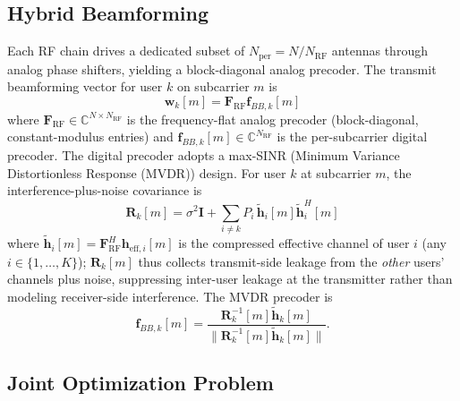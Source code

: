 \documentclass[10pt,conference]{IEEEtran}
\newcommand{\vect}[1]{\mathbf{#1}}
\newcommand{\mat}[1]{\mathbf{#1}}
\newcommand{\C}{\mathbb{C}}
\begin{document}
\subsection{Hybrid Beamforming}
Each RF chain drives a dedicated subset of $N_{\mathrm{per}} = N/N_{\mathrm{RF}}$ antennas through analog phase shifters, yielding a block-diagonal analog precoder. The transmit beamforming vector for user $k$ on subcarrier $m$ is
\begin{equation}
\vect{w}_k[m] = \mat{F}_{\text{RF}} \vect{f}_{BB,k}[m]
\label{eq:hybrid_bf}
\end{equation}
where $\mat{F}_{\text{RF}} \in \C^{N \times N_{\text{RF}}}$ is the frequency-flat analog precoder (block-diagonal, constant-modulus entries) and $\vect{f}_{BB,k}[m] \in \C^{N_{\text{RF}}}$ is the per-subcarrier digital precoder. The digital precoder adopts a max-SINR (Minimum Variance Distortionless Response (MVDR)) design. For user $k$ at subcarrier $m$, the interference-plus-noise covariance is
\begin{equation}
\mat{R}_k[m] = \sigma^2\mat{I} + \sum_{i \neq k}P_i\,\tilde{\vect{h}}_i[m]\tilde{\vect{h}}_i^H[m]
\label{eq:Rk}
\end{equation}
where $\tilde{\vect{h}}_i[m] = \mat{F}_{\text{RF}}^H\vect{h}_{\text{eff},i}[m]$ is the compressed effective channel of user $i$ (any $i \in \{1,\dots,K\}$); $\mat{R}_k[m]$ thus collects transmit-side leakage from the \emph{other} users' channels plus noise, suppressing inter-user leakage at the transmitter rather than modeling receiver-side interference. The MVDR precoder is
\begin{equation}
\vect{f}_{BB,k}[m] = \frac{\mat{R}_k^{-1}[m]\tilde{\vect{h}}_k[m]}{\|\mat{R}_k^{-1}[m]\tilde{\vect{h}}_k[m]\|}.
\label{eq:mvdr}
\end{equation}


\subsection{Joint Optimization Problem}
\end{document}
